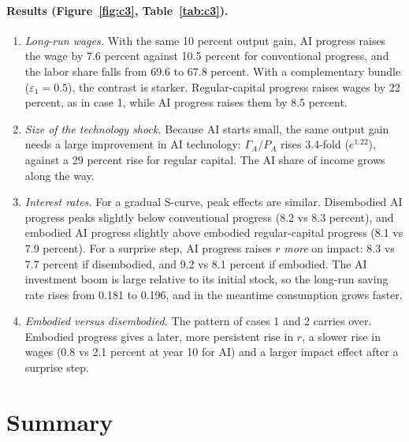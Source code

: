 \documentclass[11pt]{article}
\newcommand{\e}{\varepsilon}
\begin{document}
\paragraph{Results (Figure~\ref{fig:c3}, Table~\ref{tab:c3}).}
\begin{enumerate}
\item \emph{Long-run wages.} With the same 10 percent output gain, AI progress raises
the wage by 7.6 percent against 10.5 percent for conventional progress, and the labor
share falls from 69.6 to 67.8 percent. With a complementary bundle ($\e_1=0.5$), the
contrast is starker. Regular-capital progress raises wages by 22 percent, as in case 1,
while AI progress raises them by 8.5 percent.
\item \emph{Size of the technology shock.} Because AI starts small, the same output gain
needs a large improvement in AI technology: $\Gamma_A/P_A$ rises 3.4-fold
($e^{1.22}$), against a 29 percent rise for regular capital. The AI share of income
grows along the way.
\item \emph{Interest rates.} For a gradual S-curve, peak effects are similar. Disembodied
AI progress peaks slightly below conventional progress (8.2 vs 8.3 percent), and embodied
AI progress slightly above embodied regular-capital progress (8.1 vs 7.9 percent). For a surprise step, AI progress raises $r$ \emph{more} on impact:
8.3 vs 7.7 percent if disembodied, and 9.2 vs 8.1 percent if embodied. The AI investment
boom is large relative to its initial stock, so the long-run saving rate rises from 0.181
to 0.196, and in the meantime consumption grows faster.
\item \emph{Embodied versus disembodied.} The pattern of cases 1 and 2 carries over.
Embodied progress gives a later, more persistent rise in $r$, a slower rise in wages
(0.8 vs 2.1 percent at year 10 for AI) and a larger impact effect after a surprise step.
\end{enumerate}

\section{Summary}
\end{document}
